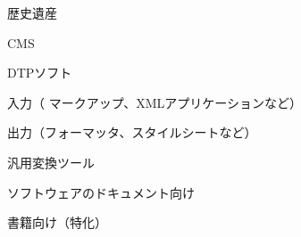 \begin{frame}[t]{\inhibitglue 歴史遺産}
  \sffamily
  \def\historical{\color{shozyohi}}
  \documentsystems
\end{frame}
  \def\historical{\color{torinoko}}

\begin{frame}[t]{\inhibitglue CMS}
  \sffamily
  \def\cms{\color{shozyohi}}
  \documentsystems
\end{frame}

  \def\cms{\color{torinoko}}

\begin{frame}[t]{\inhibitglue DTPソフト}
  \sffamily
  \def\wysiwyg{\color{shozyohi}}
  \documentsystems
\end{frame}

  \def\wysiwyg{\color{torinoko}}

\begin{frame}[t]{\inhibitglue 入力{\footnotesize （ マークアップ、XMLアプリケーションなど）}}
  \sffamily
  \def\markup{\color{moegi}}
  \documentsystems
\end{frame}

\begin{frame}[t]{\inhibitglue 出力{\footnotesize （フォーマッタ、スタイルシートなど）}}
  \sffamily
  \def\markup{\color{black}}
  \def\utility{\color{black}}
  \def\formatter{\color{ruri}}
  \def\wysiwyg{\color{ruri}}
  \documentsystems
\end{frame}

\begin{frame}[t]{\inhibitglue 汎用変換ツール}
  \sffamily
  \def\book{\color{black}}
  \def\markup{\color{black}}
  \def\formatter{\color{black}}
  \def\utility{\color{black!20!ginshu}}
  \documentsystems
\end{frame}

  \def\markup{\color{moegi}}
  \def\formatter{\color{ruri}}
  \def\wysiwyg{\color{ruri}}
  \def\utility{\color{ginshu}}

\begin{frame}[t]{\inhibitglue ソフトウェアのドキュメント向け}
  \sffamily

  \def\software{\color{shozyohi}}
  
  \documentsystems
\end{frame}

\begin{frame}[t]{\inhibitglue 書籍向け（特化）}
  \sffamily
  \def\software{\color{black}}
  \def\book{\color{shozyohi}}
  \documentsystems
\end{frame}

